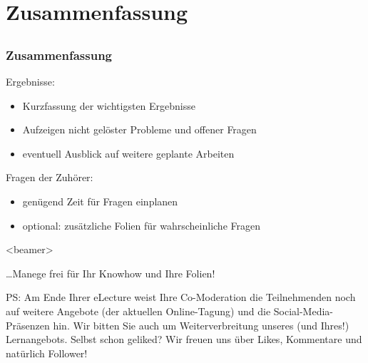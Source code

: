 \documentclass{beamer}
\begin{document}
\section{Zusammenfassung}

\subsection*{}

\begin{frame}
	\frametitle<presentation>{Zusammenfassung}
	\begin{block}{Ergebnisse:}
	  \begin{itemize}
	  	\item Kurzfassung der wichtigsten Ergebnisse
	  	\item Aufzeigen nicht gelöster Probleme und offener Fragen
	  	\item eventuell Ausblick auf weitere geplante Arbeiten
		\end{itemize}
	\end{block}
	\begin{block}{Fragen der Zuhörer:}
	 \begin{itemize}
	 	\item genügend Zeit für Fragen einplanen
	 	\item optional: zusätzliche Folien für wahrscheinliche Fragen
	 \end{itemize}
	\end{block}	
\end{frame}

\miniframesoff

\begin{frame}<beamer>{}
	\begin{center}
		\ldots Manege frei für Ihr Knowhow und Ihre Folien!
	\end{center}
	\vspace{3cm}
	\tiny
	PS: Am Ende Ihrer eLecture weist Ihre Co-Moderation die Teilnehmenden noch auf weitere Angebote (\zB der aktuellen Online-Tagung) und die Social-Media-Präsenzen hin. Wir bitten Sie auch um Weiterverbreitung unseres (und Ihres!) Lernangebots. Selbst schon geliked? Wir freuen uns über Likes, Kommentare und natürlich Follower!
\end{frame}
\end{document}
